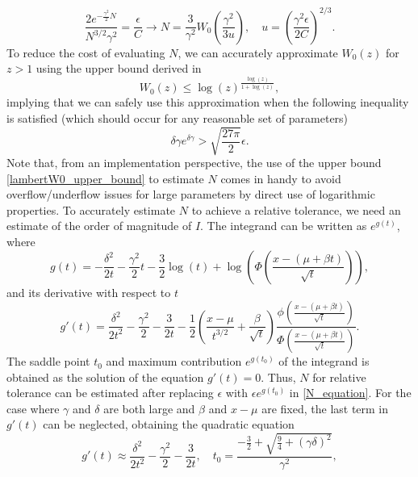 \documentclass[10pt,a4paper,oneside]{article}
\numberwithin{equation}{section}
\begin{document}
\begin{equation}\label{N_equation}
\frac{2 e^{- \frac{\gamma^2}{2}N}}{N^{3/2} \gamma^2} = \frac{\epsilon}{C} \longrightarrow N = \frac{3}{\gamma^2}W_0\left(\frac{\gamma^2}{3u}\right), \quad u = \left(\frac{\gamma^2 \epsilon}{2 C}\right)^{2/3}.
\end{equation}
To reduce the cost of evaluating $N$, we can accurately approximate $W_0(z)$ for $z > 1$ using the upper bound derived in \cite{Hoorfar2008}
\begin{equation}\label{lambertW0_upper_bound}
W_0(z) \le \log(z)^{\tfrac{\log(z)}{1 + \log(z)}},
\end{equation}
implying that we can safely use this approximation when the following inequality is satisfied (which should occur for any reasonable set of parameters)
\begin{equation}
\delta \gamma e^{\delta\gamma} > \sqrt{\frac{27 \pi}{2}} \epsilon.
\end{equation}
Note that, from an implementation perspective, the use of the upper bound  \eqref{lambertW0_upper_bound} to estimate $N$ comes in handy to avoid overflow/underflow issues for large parameters by direct use of logarithmic properties. 
To accurately estimate $N$ to achieve a relative tolerance, we need an estimate of the order of magnitude of $I$. The integrand can be written as $e^{g(t)}$, where
\begin{equation}
g(t) = -\frac{\delta^2}{2t} - \frac{\gamma^2}{2}t - \frac{3}{2}\log(t) + \log\left(\Phi\left(\frac{x - (\mu +\beta t)}{\sqrt{t}}\right)\right),
\end{equation}
and its derivative with respect to $t$
\begin{equation}\label{saddle_point_equation}
g'(t) = \frac{\delta^2}{2t^2} -\frac{\gamma^2}{2} -\frac{3}{2t} -\frac{1}{2}\left(\frac{x-\mu}{t^{3/2}} + \frac{\beta}{\sqrt{t}} \right)\frac{\phi\left(\frac{x - (\mu +\beta t)}{\sqrt{t}}\right)}{\Phi\left(\frac{x - (\mu +\beta t)}{\sqrt{t}}\right)}.
\end{equation}
The saddle point $t_0$ and maximum contribution $e^{g(t_0)}$ of the integrand is obtained as the solution of the equation $g'(t) = 0$. Thus, $N$ for relative tolerance can be estimated after replacing $\epsilon$ with $\epsilon e^{g(t_0)}$ in \eqref{N_equation}. For the case where $\gamma$ and $\delta$ are both large and $\beta$ and $x-\mu$ are fixed, the last term in $g'(t)$ can be neglected, obtaining the quadratic equation
\begin{equation}\label{saddle_point_1}
g'(t) \approx \frac{\delta^2}{2t^2} -\frac{\gamma^2}{2} -\frac{3}{2t}, \quad t_0 = \frac{-\frac{3}{2} + \sqrt{\frac{9}{4} + (\gamma \delta)^2}}{\gamma^2},
\end{equation}
\end{document}
